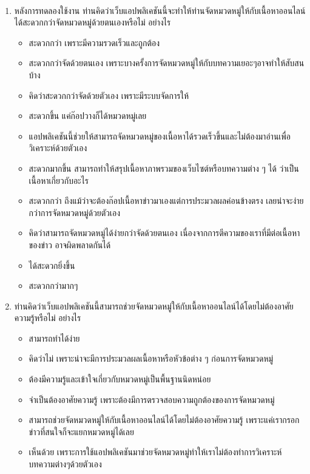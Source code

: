 \documentclass[12pt,oneside,openright,a4paper]{cpe-thai-project}
\begin{document}
\newpage
{} \\
\begin{enumerate}
  \item หลังการทดลองใช้งาน ท่านคิดว่าเว็บแอปพลิเคชันนี้จะทำให้ท่านจัดหมวดหมู่ให้กับเนื้อหาออนไลน์ได้สะดวกกว่าจัดหมวดหมู่ด้วยตนเองหรือไม่ อย่างไร
        \begin{itemize}
          \item สะดวกกว่า เพราะมีความรวดเร็วและถูกต้อง
          \item สะดวกกว่าจัดด้วยตนเอง เพราะบางครั้งการจัดหมวดหมู่ให้กับบทความเยอะๆอาจทำให้สับสนบ้าง
          \item คิดว่าสะดวกกว่าจัดด้วยตัวเอง เพราะมีระบบจัดการให้
          \item สะดวกขึ้น แค่ก๊อปวางก็ได้หมวดหมู่เลย
          \item แอปพลิเคชันนี้ช่วยให้สามารถจัดหมวดหมู่ของเนื้อหาได้รวดเร็วขึ้นและไม่ต้องมาอ่านเพื่อวิเคราะห์ด้วยตัวเอง
          \item สะดวกมากขึ้น สามารถทำให้สรุปเนื้อหาภาพรวมของเว็บไซต์หรือบทความต่าง ๆ ได้ ว่าเป็นเนื้อหาเกี่ยวกับอะไร
          \item สะดวกกว่า ถึงแม้ว่าจะต้องก๊อปเนื้อหาข่าวมาเองแต่การประมวลผลค่อนข้างตรง เลยน่าจะง่ายกว่าการจัดหมวดหมู่ด้วยตัวเอง
          \item คิดว่าสามารถจัดหมวดหมู่ได้ง่ายกว่าจัดด้วยตนเอง เนื่องจากการตีความของเราที่มีต่อเนื้อหาของข่าว อาจผิดพลาดกันได้
          \item ได้สะดวกยิ่งขึ้น
          \item สะดวกกว่ามากๆ
        \end{itemize}
  \item ท่านคิดว่าเว็บแอปพลิเคชันนี้สามารถช่วยจัดหมวดหมู่ให้กับเนื้อหาออนไลน์ได้โดยไม่ต้องอาศัยความรู้หรือไม่ อย่างไร
        \begin{itemize}
          \item สามารถทำได้ง่าย
          \item คิดว่าไม่ เพราะน่าจะมีการประมวลผลเนื้อหาหรือหัวข้อต่าง ๆ ก่อนการจัดหมวดหมู่
          \item ต้องมีความรู้และเข้าใจเกี่ยวกับหมวดหมู่เป็นพื้นฐานนิดหน่อย
          \item จำเป็นต้องอาศัยความรู้ เพราะต้องมีการตรวจสอบความถูกต้องของการจัดหมวดหมู่
          \item สามารถช่วยจัดหมวดหมู่ให้กับเนื้อหาออนไลน์ได้โดยไม่ต้องอาศัยความรู้ เพราะแค่เรากรอกข่าวที่สนใจก็จะแยกหมวดหมู่ได้เลย
          \item เห็นด้วย เพราะการใช้แอปพลิเคชันมาช่วยจัดหมวดหมู่ทำให้เราไม่ต้องทำการวิเคราะห์บทความต่างๆด้วยตัวเอง

\end{itemize}
\end{enumerate}
\end{document}
